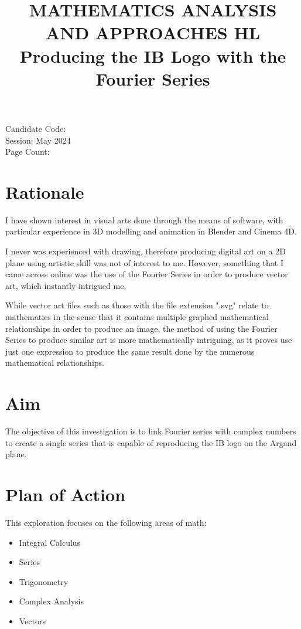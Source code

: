 \documentclass[letterpaper, 12pt]{article}
\title{MATHEMATICS ANALYSIS AND APPROACHES HL
\\
Producing the IB Logo with the Fourier Series}
\author{}
\date{}
\begin{document}
\nocite{*}

\maketitle
\begin{center}
    Candidate Code:
    \\
    Session: May 2024
    \\
    Page Count:
\end{center}
\newpage

\tableofcontents
\newpage


\setcounter{page}{1}

\section{Rationale}

I have shown interest in visual arts done through the means of software,
with particular experience in 3D modelling and animation in Blender
and Cinema 4D.

I never was experienced with drawing, therefore producing digital art
on a 2D plane using artistic skill was not of interest to me. However,
something that I came across online was the use of the Fourier Series
in order to produce vector art, which instantly intrigued me.

While vector art files such as those with the file extension ".svg" relate
to mathematics in the sense that it contains multiple graphed mathematical
relationships in order to produce an image, the method of using the Fourier
Series to produce similar art is more mathematically intriguing, as it
proves use just one expression to produce the same result done by the numerous mathematical
relationships.


\section{Aim}

The objective of this investigation is to link Fourier series with
complex numbers to create a single series that is capable
of reproducing the IB logo on the Argand plane.

\section{Plan of Action}

This exploration focuses on the following areas of math:
\begin{itemize}
    \item Integral Calculus
    \item Series
    \item Trigonometry
    \item Complex Analysis
    \item Vectors
\end{itemize}
\end{document}
